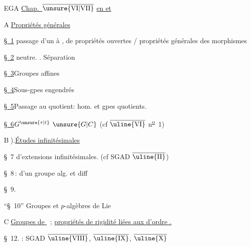 \noindent EGA \uline{Chap.\ $\overline{\mathrm{\unsure{VI|VII}}}$}\qquad
\uline{ en  et  }

\noindent\textcircled{A}\quad \uline{Propriétés générales}

\noindent\uline{\S~1}\quad {}  passage d'un  à , de propriétés ouvertes / propriétés générales des morphismes

\noindent\uline{\S~2}\quad {} neutre. . Séparation

\noindent\uline{\S~3}\quad Groupes affines

\reversemarginpar
\noindent{}\uline{\S~4}\quad Sous-gpes engendrés
\normalmarginpar

\noindent\uline{\S~5}\quad Passage au quotient:  hom. et gpes quotients.

\noindent\uline{\S~6}\quad $G^{\unsure{\tau|t}}$  $\unsure{G|C}$  (cf  $\overline{\text{\uline{VI}}}$ n\textsuperscript{\uline{o}}~1)

\noindent\textcircled{B}).\quad \uline{Études infinitésimales}

\noindent\S~7\quad {} d'extensions infinitésimales. (cf SGAD $\overline{\text{\uline{II}}}$)

\noindent\S~8\,: \quad {} d'un groupe alg. et  diff 

\noindent\S~9.\quad {}

\noindent``\S~10''\quad {} Groupes  et $p$-algèbres de Lie

\noindent{}

\noindent{}

\noindent\textcircled{C}\quad \uline{Groupes de  }\ ; \uline{propriétés de rigidité liées aux  d'ordre .}

\noindent\S~12.\quad {} : SGAD $\overline{\text{\uline{VIII}}}$, $\overline{\text{\uline{IX}}}$, $\overline{\text{\uline{X}}}$

\clearpage
